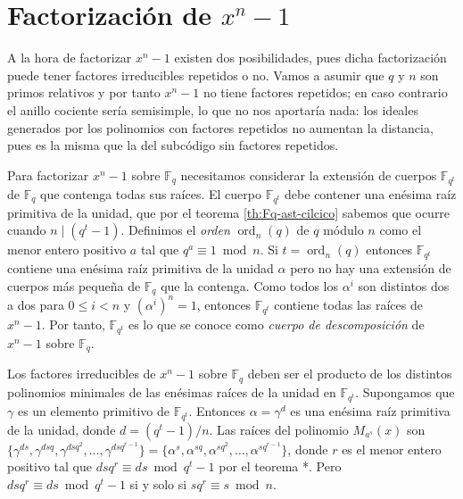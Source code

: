 \section{Factorización de \texorpdfstring{\(x^n -1\)}{xn - 1}}

\label{sec:factorizacion-xn-1}

A la hora de factorizar \(x^n -1\) existen dos posibilidades, pues dicha factorización puede tener factores irreducibles repetidos o no.
Vamos a asumir que \(q\) y \(n\) son primos relativos y por tanto \(x^n - 1\) no tiene factores repetidos; en caso contrario el anillo cociente sería semisimple, lo que no nos aportaría nada: los ideales generados por los polinomios con factores repetidos no aumentan la distancia, pues es la misma que la del subcódigo sin factores repetidos.

Para factorizar \(x^n - 1\) sobre \(\mathbb F_q\) necesitamos considerar la extensión de cuerpos \(\mathbb F_{q^t}\) de \(\mathbb F_q\) que contenga todas sus raíces.
El cuerpo \(\mathbb F_{q^t}\) debe contener una enésima raíz primitiva de la unidad, que por el teorema \ref{th:Fq-ast-cilcico} sabemos que ocurre cuando \(n \mid (q^t - 1)\).
Definimos el \textit{orden} \(\operatorname{ord}_n(q)\) de \(q\) módulo \(n\) como el menor entero positivo \(a\) tal que \(q^{a} \equiv 1 \bmod n\).
Si \(t = \operatorname{ord}_n(q)\) entonces \(\mathbb F_{q^t}\) contiene una enésima raíz primitiva de la unidad \(\alpha\) pero no hay una extensión de cuerpos más pequeña de \(\mathbb F_q\) que la contenga.
Como todos los \(\alpha^{i}\) son distintos dos a dos para \(0 \leq i < n\) y \((\alpha^{i})^n = 1\), entonces \(\mathbb F_{q^t}\) contiene todas las raíces de \(x^n - 1\).
Por tanto, \(\mathbb F_{q^t}\) es lo que se conoce como \textit{cuerpo de descomposición} de \(x^n - 1\) sobre \(\mathbb F_q\).

Los factores irreducibles de \(x^n - 1\) sobre \(\mathbb F_q\) deben ser el producto de los distintos polinomios minimales de las enésimas raíces de la unidad en \(\mathbb F_{q^t}\).
Supongamos que \(\gamma\) es un elemento primitivo de \(\mathbb F_{q^t}\).
Entonces \(\alpha = \gamma^d\) es una enésima raíz primitiva de la unidad, donde \(d = (q^t - 1)/n\).
Las raíces del polinomio \(M_{a^s}(x)\) son \(\{\gamma^{ds}, \gamma^{dsq}, \gamma^{dsq^2}, \dots, \gamma^{dsq^{r-1}}\} = \{\alpha^s, \alpha^{sq}, \alpha^{sq^2}, \dots, \alpha^{sq^{r-1}}\}\), donde \(r\) es el menor entero positivo tal que \(dsq^r \equiv ds \bmod q^t - 1\) por el teorema *.
Pero \(dsq^r \equiv ds \bmod q^t - 1\) si y solo si \(sq^r \equiv s \bmod n\).

